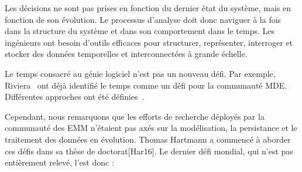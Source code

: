 %
Les décisions ne sont pas prises en fonction du dernier état du système, mais en fonction de son évolution.
Le processus d'analyse doit donc naviguer à la fois dans la structure du système et dans son comportement dans le temps.
Les ingénieurs ont besoin d'outils efficaces pour structurer, représenter, interroger et stocker des données temporelles et interconnectées à grande échelle.

Le temps consacré au génie logiciel n'est pas un nouveau défi. 
Par exemple, Riviera~\etal \cite{DBLP:conf/models/RiveraRV08} ont déjà identifié le temps comme un défi pour la communauté MDE. Différentes approches ont été définies~\cite{DBLP:conf/sle/BousseCCGB15, DBLP:conf/sle/KansoT12, DBLP:conf/icse/KoegelH10, DBLP:conf/seke/0001FNMKT14}.

Cependant, nous remarquons que les efforts de recherche déployés par la communauté des EMM n'étaient pas axés sur la modélisation, la persistance et le traitement des données en évolution. Thomas Hartmann a commencé à aborder ces défis dans sa thèse de doctorat[Har16]. Le dernier défi mondial, qui n'est pas entièrement relevé, l'est donc :
\vspace{-2em}
